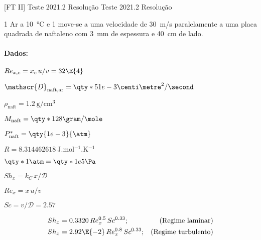 \documentclass[\mainfilename]{subfiles}
\begin{document}

[FT II]
{Teste 2021.2 Resolução} %
{Teste 2021.2 Resolução} %

\begin{questionBox}1{ %
    Ar a \qty*{10}{\celsius} e \qty*{1}{\atm} move-se a uma velocidade de \qty*{30}{\metre/\second} paralelamente a uma placa quadrada de naftaleno com \qty*{3}{\milli\metre} de espessura e \qty*{40}{\centi\metre} de lado.
} %
    \def\naft{\text{naft}}
    \def\ar{\text{ar}}
    \paragraph*{Dados:}
    \begin{itemize}
        \begin{multicols}{2}
            \item \(Re_{x,c}=x_c\,u/v=32\E{4}\)
            \item \(\mathscr{D}_{\naft,\ar}=\qty*{51e-3}{\centi\metre^{2}/\second}\)
            \item \(\rho_{\naft}=\qty{1.2}{\gram/\centi\metre^3}\)
            \item \(M_{\naft}=\qty*{128}{\gram/\mole}\)
            \item \(P^*_{\naft}=\qty{1e-3}{\atm}\)
        \end{multicols}
        \begin{multicols}{2}
            \item \(R=\qty{8.314462618}{\joule.\mole^{-1}.\kelvin^{-1}}\)
            \item \(\qty*{1}{\atm}=\qty*{1e5}{\Pa}\)
            \item \(Sh_x=k_C\,x/\mathscr{D}\)
            \item \(Re_x=x\,u/v\)
            \item \(Sc=v/\mathscr{D}=2.57\)
        \end{multicols}
    \end{itemize}
    \begin{align*}
        Sh_x&=0.3320\,Re_x^{0.5}\,Sc^{0.33};& \text{(Regime laminar)}
        \\
        Sh_x&=2.92\E{-2}\,Re_x^{0.8}\,Sc^{0.33};& \text{(Regime turbulento)}
    \end{align*}
\end{questionBox}
\end{document}
